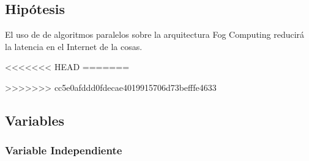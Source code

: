     \subsection{Hipótesis}
        El uso de de algoritmos paralelos sobre la arquitectura Fog Computing reducirá la latencia en el Internet de la cosas.\par
<<<<<<< HEAD
    \newpage
=======


\newpage

>>>>>>> cc5e0afddd0fdecae4019915706d73befffe4633
    \subsection{Variables}
        \subsubsection{Variable Independiente}
